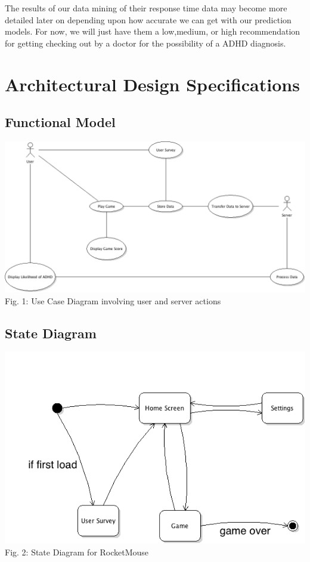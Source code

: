 \documentclass[a4wide]{article}
\begin{document}
The results of our data mining of their response time data may become more detailed later on depending upon how accurate we can get with our prediction models. For now, we will just have them a low,medium, or high recommendation for getting checking out by a doctor for the possibility of a ADHD diagnosis.

\section{Architectural Design Specifications}

\subsection{Functional Model}
\includegraphics[width=\textwidth]{images/UseCaseDiagram.png}
\small Fig. 1: Use Case Diagram involving user and server actions
\subsection{State Diagram}
\includegraphics[width=\textwidth]{images/StateDiagram.png}
Fig. 2: State Diagram for RocketMouse
\end{document}
